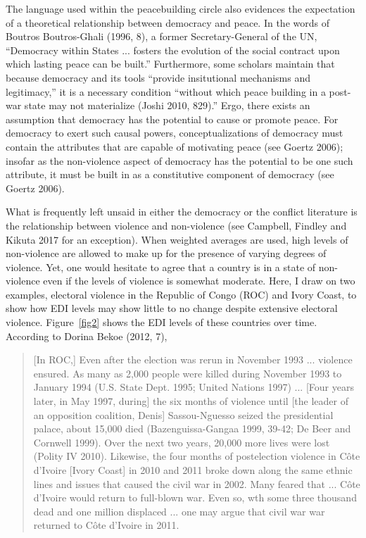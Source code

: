 \documentclass [11pt]{article}
\begin{document}
The language used within the peacebuilding circle also evidences the expectation of a theoretical relationship between democracy and peace. In the words of Boutros Boutros-Ghali (1996, 8), a former Secretary-General of the UN, ``Democracy within States ... fosters the evolution of the social contract upon which lasting peace can be built.'' Furthermore, some scholars maintain that because democracy and its tools ``provide insitutional mechanisms and legitimacy,'' it is a necessary condition ``without which peace building in a post-war state may not materialize (Joshi 2010, 829).'' Ergo, there exists an assumption that democracy has the potential to cause or promote peace. For democracy to exert such causal powers, conceptualizations of democracy must contain the attributes that are capable of motivating peace (see Goertz 2006); insofar as the non-violence aspect of democracy has the potential to be one such attribute, it must be built in as a constitutive component of democracy (see Goertz 2006).

What is frequently left unsaid in either the democracy or the conflict literature is the relationship between violence and non-violence (see Campbell, Findley and Kikuta 2017 for an exception). When weighted averages are used, high levels of non-violence are allowed to make up for the presence of varying degrees of violence. Yet, one would hesitate to agree that a country is in a state of non-violence even if the levels of violence is somewhat moderate. Here, I draw on two examples, electoral violence in the Republic of Congo (ROC) and Ivory Coast, to show how EDI levels may show little to no change despite extensive electoral violence. Figure~\ref{fig2} shows the EDI levels of these countries over time. According to Dorina Bekoe (2012, 7),

\begin{quote}
\small
[In ROC,] Even after the election was rerun in November 1993 ... violence ensured. As many as 2,000 people were killed during November 1993 to January 1994 (U.S. State Dept. 1995; United Nations 1997) ... [Four years later, in May 1997, during] the six months of violence until [the leader of an opposition coalition, Denis] Sassou-Nguesso seized the presidential palace, about 15,000 died (Bazenguissa-Gangaa 1999, 39-42; De Beer and Cornwell 1999). Over the next two years, 20,000 more lives were lost (Polity IV 2010). Likewise, the four months of postelection violence in Côte d'Ivoire [Ivory Coast] in 2010 and 2011 broke down along the same ethnic lines and issues that caused the civil war in 2002. Many feared that ... Côte d'Ivoire would return to full-blown war. Even so, wth some three thousand dead and one million displaced ... one may argue that civil war war returned to Côte d'Ivoire in 2011.
\end{quote}
\end{document}
